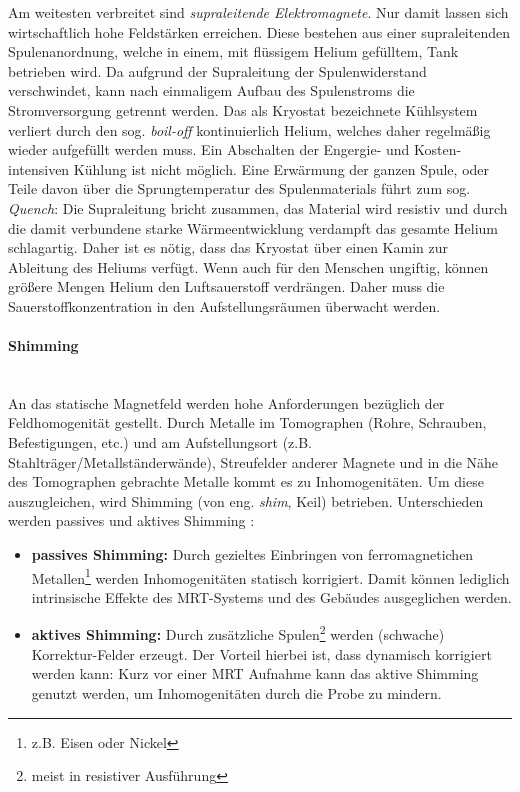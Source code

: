 Am weitesten verbreitet sind \textit{supraleitende Elektromagnete}. Nur damit lassen sich wirtschaftlich hohe Feldstärken erreichen. Diese bestehen aus einer supraleitenden Spulenanordnung, welche in einem, mit flüssigem Helium gefülltem, Tank betrieben wird. Da aufgrund der Supraleitung der Spulenwiderstand verschwindet, kann nach einmaligem Aufbau des Spulenstroms die Stromversorgung getrennt werden. Das als Kryostat bezeichnete Kühlsystem verliert durch den sog. \textit{boil-off} kontinuierlich Helium, welches daher regelmäßig wieder aufgefüllt werden muss. Ein Abschalten der Engergie- und Kosten-intensiven Kühlung ist nicht möglich. Eine Erwärmung der ganzen Spule, oder Teile davon über die Sprungtemperatur des Spulenmaterials führt zum sog. \textit{Quench}: Die Supraleitung bricht zusammen, das Material wird resistiv und durch die damit verbundene starke Wärmeentwicklung verdampft das gesamte Helium schlagartig. Daher ist es nötig, dass das Kryostat über einen Kamin zur Ableitung des Heliums verfügt. Wenn auch für den Menschen ungiftig, können größere Mengen Helium den Luftsauerstoff verdrängen. Daher muss die Sauerstoffkonzentration in den Aufstellungsräumen überwacht werden.


\paragraph{Shimming}\mbox{}\\
An das statische Magnetfeld werden hohe Anforderungen bezüglich der Feldhomogenität gestellt.
Durch Metalle im Tomographen (Rohre, Schrauben, Befestigungen, etc.) und am Aufstellungsort (z.B. Stahlträger/Metallständerwände), Streufelder anderer Magnete und in die Nähe des Tomographen gebrachte Metalle kommt es zu Inhomogenitäten.
Um diese auszugleichen, wird Shimming (von eng. \textit{shim}, Keil) betrieben. Unterschieden werden passives und aktives Shimming \cite{Lipton2008}:
\begin{itemize}
	\item \textbf{passives Shimming:} Durch gezieltes Einbringen von ferromagnetichen Metallen\footnote{z.B. Eisen oder Nickel} werden Inhomogenitäten statisch korrigiert. Damit können lediglich intrinsische Effekte des MRT-Systems und des Gebäudes ausgeglichen werden.
	\item \textbf{aktives Shimming:} Durch zusätzliche Spulen\footnote{meist in resistiver Ausführung} werden (schwache) Korrektur-Felder erzeugt. Der Vorteil hierbei ist, dass dynamisch korrigiert werden kann: Kurz vor einer MRT Aufnahme kann das aktive Shimming genutzt werden, um Inhomogenitäten  durch die Probe zu mindern.  
\end{itemize}

